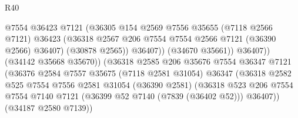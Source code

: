 \begin{lexlean}{R40}
\begin{coremodule}
                                          @7554
                                          @36423
                                          @7121
                                          (@36305
                                            @154
                                            @2569
                                            @7556
                                            @35655
                                            (@7118 @2566 @7121)
                                            @36423
                                            (@36318
                                              @2567
                                              @206
                                              @7554
                                              @7554
                                              @2566
                                              @7121
                                              (@36390 @2566)
                                              @36407)
                                            (@30878 @2565))
                                          @36407))
                                      (@34670 @35661))
                                    @36407))
                                (@34142 @35668 @35670))
                              (@36318
                                @2585
                                @206
                                @35676
                                @7554
                                @36347
                                @7121
                                (@36376
                                  @2584
                                  @7557
                                  @35675
                                  (@7118 @2581 @31054)
                                  @36347
                                  (@36318
                                    @2582
                                    @525
                                    @7554
                                    @7556
                                    @2581
                                    @31054
                                    (@36390 @2581)
                                    (@36318
                                      @523
                                      @206
                                      @7554
                                      @7554
                                      @7140
                                      @7121
                                      (@36399 @52 @7140 (@7839 (@36402 @52)))
                                      @36407))
                                  (@34187 @2580 @7139))

\end{coremodule}
\end{lexlean}
